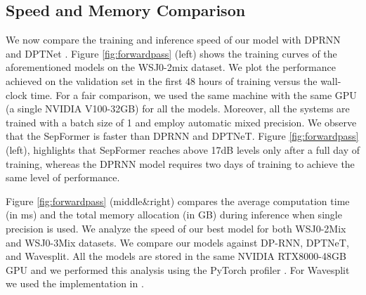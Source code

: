 \documentclass{article}
\begin{document}
 \begin{table}[t]
 \caption{Best results on the WSJ0-3mix dataset.}
 \vspace{0.1cm}
 \label{table:3mix}
 \centering
\end{table}

\vspace{-0.40cm}
\subsection{Speed and Memory Comparison}
\label{sec:speed}

We now compare the training and inference speed of our model with DPRNN \cite{luo2020dualpath} and DPTNet \cite{dptn}. Figure \ref{fig:forwardpass} (left) shows the training curves of the aforementioned models on the WSJ0-2mix dataset. We plot the performance achieved on the validation set in the first 48 hours of training versus the wall-clock time. For a fair comparison, we used the same machine with the same GPU (a single NVIDIA V100-32GB) for all the models. Moreover, all the systems are trained with a batch size of 1 and employ automatic mixed precision.  We observe that the SepFormer is faster than DPRNN and DPTNeT.  Figure \ref{fig:forwardpass} (left), highlights that SepFormer 
reaches above 17dB levels only after a full day of training, whereas the DPRNN model requires two days of training to achieve the same level of performance.  

Figure \ref{fig:forwardpass} (middle\&right) compares the average computation time (in ms) and the total memory allocation (in GB) during inference when single precision is used. We analyze the speed of our best model for both WSJ0-2Mix and WSJ0-3Mix datasets. We compare our models against DP-RNN, DPTNeT, and Wavesplit. All the models are stored in the same NVIDIA RTX8000-48GB GPU and we performed this analysis using the PyTorch profiler \cite{pytorch-profiler}. For Wavesplit we used the implementation in \cite{pariente:hal-02962964}.
\end{document}
